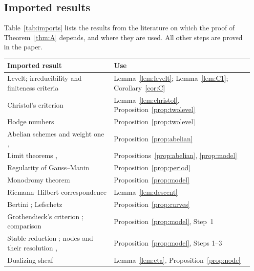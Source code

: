 \documentclass[11pt]{amsart}
\theoremstyle{definition}
\theoremstyle{remark}
\numberwithin{equation}{section}
\begin{document}
\subsection*{Imported results}
Table~\ref{tab:imports} lists the results from the literature on which the proof of Theorem~\ref{thm:A} depends, and where they are used. All other steps are proved in the paper.

\begin{table}[ht]
\centering
\small
\renewcommand{\arraystretch}{1.15}
\begin{tabular}{>{\raggedright\arraybackslash}p{}>{\raggedright\arraybackslash}p{}}
\toprule
Imported result & Use\\
\midrule
Levelt; irreducibility and finiteness criteria \citep[Prop.~3.3, Thm.~3.5, Thm.~4.8]{BeukersHeckman1989} & Lemma~\ref{lem:levelt}; Lemma~\ref{lem:C1}; Corollary~\ref{cor:C}\\
Christol's criterion \citep[Props.~1, 1bis]{Christol1987} & Lemma~\ref{lem:christol}, Proposition~\ref{prop:twolevel}\\
Hodge numbers \citep[Prop.~2.6, Thm.~1]{Fedorov2018} & Proposition~\ref{prop:twolevel}\\
Abelian schemes and weight one \citep[4.4.3]{Deligne1971}, \citep[Thm.~7.13]{Milne2013} & Proposition~\ref{prop:abelian}\\
Limit theorems \citep[\S8]{EGAIV3}, \citep[\S17]{EGAIV4} & Propositions~\ref{prop:abelian}, \ref{prop:model}\\
Regularity of Gauss--Manin \citep[II.7.9, II.6.14]{Deligne1970} & Proposition~\ref{prop:period}\\
Monodromy theorem \citep{Katz1970} & Proposition~\ref{prop:model}\\
Riemann--Hilbert correspondence \citep[II.5.9, I.2.17]{Deligne1970} & Lemma~\ref{lem:descent}\\
Bertini \citep[\S6]{Jouanolou1983}; Lefschetz \citep[\S3.1]{Lazarsfeld2004} & Proposition~\ref{prop:curves}\\
Grothendieck's criterion \citep[Exp.~IX, \S3]{SGA7I}; comparison \citep[Exp.~XIV]{DeligneKatz1973} & Proposition~\ref{prop:model}, Step~1\\
Stable reduction \citep[Thm.~2.4]{DeligneMumford1969}; nodes and their resolution \citep[\S1]{DeligneMumford1969}, \citep[\S10.3]{Liu2002} & Proposition~\ref{prop:model}, Steps 1--3\\
Dualizing sheaf \citep[\S6.4]{Liu2002} & Lemma~\ref{lem:eta}, Proposition~\ref{prop:node}\\

\end{tabular}
\end{table}
\end{document}
